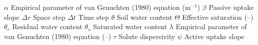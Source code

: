 {\vskip 10pt

\symb $\alpha$		Empirical parameter of van Genuchten (1980) equation (m$^{-1}$)
\symb $\beta$		Passive uptake slope \uwatflux
\symb $\Delta r$	Space step \uhead
\symb $\Delta t$	Time step \utime
\symb $\theta$		Soil water content \uwc
\symb $\Theta$		Effective saturation (--)
\symb $\theta_r$	Residual water content \uwc
\symb $\theta_s$	Saturated water content \uwc
\symb $\lambda$		Empirical parameter of van Genuchten (1980) equation (--)
\symb $\tau$		Solute dispersivity \uhead
\symb $\psi$		Active uptake slope \uwatflux

}

